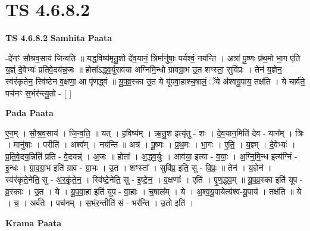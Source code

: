 \documentclass[17pt]{extarticle}
\begin{document}
\section{ TS 4.6.8.2 }

\textbf{TS 4.6.8.2 } \newline
\textbf{Samhita Paata} \newline

-दे॑नꣳ सौश्रव॒साय॑ जिन्वति ॥ यद्ध॒विष्य॑मृतु॒शो दे॑व॒यानं॒ त्रिर्मानु॑षाः॒ पर्यश्वं॒ नय॑न्ति । अत्रा॑ पू॒ष्णः प्र॑थ॒मो भा॒ग ए॑ति य॒ज्ञ्ं दे॒वेभ्यः॑ प्रतिवे॒दय॑न्न॒जः ॥ होता᳚ऽद्ध्व॒र्युराव॑या अग्निमि॒न्धो ग्रा॑वग्रा॒भ उ॒त शꣳस्ता॒ सुवि॑प्रः । तेन॑ य॒ज्ञेन॒ स्व॑रंकृतेन॒ स्वि॑ष्टेन व॒क्षणा॒ आ पृ॑णद्ध्वं ॥ यू॒प॒व्र॒स्का उ॒त ये यू॑पवा॒हाश्च॒षालं॒ ॅये अ॑श्वयू॒पाय॒ तक्ष॑ति । ये चार्व॑ते॒ पच॑नꣳ स॒भंर॑न्त्यु॒तो - [  ] \newline

\textbf{Pada Paata} \newline

ए॒न॒म् । सौ॒श्र॒व॒साय॑ । जि॒न्व॒ति॒ ॥ यत् । ह॒विष्य᳚म् । ऋ॒तु॒श इत्यृ॑तु - शः । दे॒व॒यान॒मिति॑ देव - यान᳚म् । त्रिः । मानु॑षाः । परीति॑ । अश्व᳚म् । नय॑न्ति ॥ अत्र॑ । पू॒ष्णः । प्र॒थ॒मः । भा॒गः । ए॒ति॒ । य॒ज्ञ्म् । दे॒वेभ्यः॑ । प्र॒ति॒वे॒दय॒न्निति॑ प्रति - वे॒दयन्न्॑ । अ॒जः ॥ होता᳚ । अ॒द्ध्व॒र्युः । आव॑या॒ इत्या - व॒याः॒ । अ॒ग्नि॒मि॒न्ध इत्य॑ग्निं - इ॒न्धः । ग्रा॒व॒ग्रा॒भ इति॑ ग्राव - ग्रा॒भः । उ॒त । शꣳस्ता᳚ । सुवि॑प्र॒ इति॒ सु - वि॒प्रः॒ ॥ तेन॑ । य॒ज्ञेन॑ । स्व॑रंकृते॒नेति॒ सु - अ॒र॒कृं॒ते॒न॒ । स्वि॑ष्टे॒नेति॒ सु - इ॒ष्टे॒न॒ । व॒क्षणाः᳚ । एति॑ । पृ॒ण॒द्ध्व॒म् ॥ यू॒प॒व्र॒स्का इति॑ यूप - व्र॒स्काः । उ॒त । ये । यू॒प॒वा॒हा इति॑ यूप - वा॒हाः । च॒षाल᳚म् । ये । अ॒श्व॒यू॒पायेत्य॑श्व-यू॒पाय॑ । तक्ष॑ति ॥ ये । च॒ । अर्व॑ते । पच॑नम् । स॒भंर॒न्तीति॑ सं - भर॑न्ति । उ॒तो इति॑ ।  \newline


\textbf{Krama Paata} \newline
\end{document}
